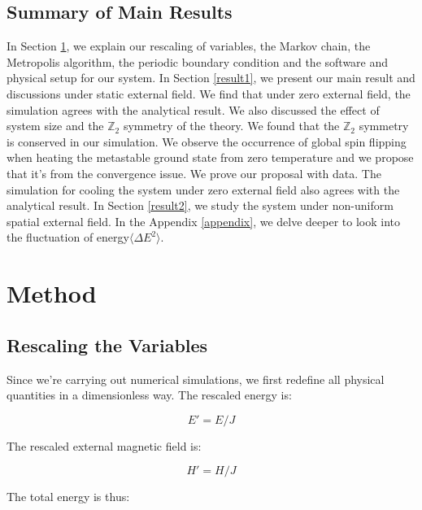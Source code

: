 \documentclass[11pt]{article}
\begin{document}
\subsection{Summary of Main Results}
In Section \ref{method}, we explain our rescaling of variables, the Markov chain, the Metropolis algorithm, the periodic boundary condition and the software and physical setup for our system. In Section \ref{result1}, we present our main result and discussions under static external field. We find that under zero external field, the simulation agrees with the analytical result. We also discussed the effect of system size and the $\mathbb{Z}_2$ symmetry of the theory. We found that the $\mathbb{Z}_2$ symmetry is conserved in our simulation. We observe the occurrence of global spin flipping when heating the metastable ground state from zero temperature and we propose that it's from the convergence issue. We prove our proposal with data. The simulation for cooling the system under zero external field also agrees with the analytical result. In Section \ref{result2}, we study the system under non-uniform spatial external field. In the Appendix \ref{appendix}, we delve deeper to look into the fluctuation of energy$\langle \Delta E^2 \rangle$. 

\section{Method}\label{method}

\subsection{Rescaling the Variables}

Since we're carrying out numerical simulations, we first redefine all physical quantities in a dimensionless way. The rescaled energy is:

\begin{equation}
    E' = E / J
\end{equation}

The rescaled external magnetic field is:

\begin{equation}
    H' = H / J
\end{equation}

The total energy is thus:
\end{document}
